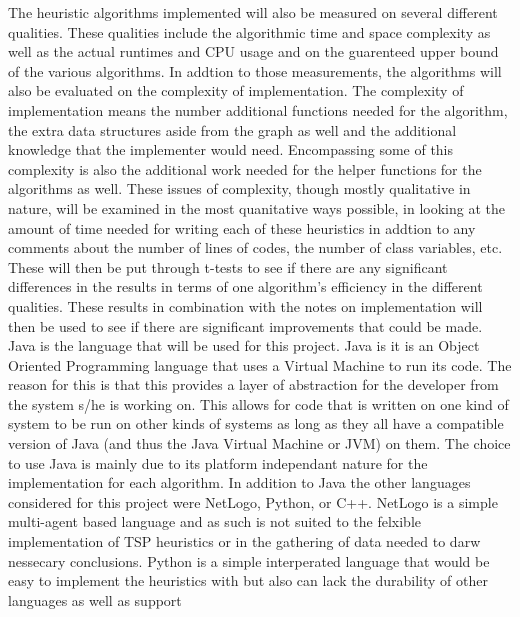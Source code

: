 \documentclass[midd]{thesis}
\newcommand{\tab}{\hspace*{2em}}
\begin{document}
\tab The heuristic algorithms implemented will also be measured on several different qualities. These qualities include the algorithmic time and space complexity as well as the actual runtimes and CPU usage and on the guarenteed upper bound of the various algorithms. In addtion to those measurements, the algorithms will also be evaluated on the complexity of implementation. The complexity of implementation means the number additional functions needed for the algorithm, the extra data structures aside from the graph as well and the additional knowledge that the implementer would need. Encompassing some of this complexity is also the additional work needed for the helper functions for the algorithms as well. These issues of complexity, though mostly qualitative in nature, will be examined in the most quanitative ways possible, in looking at the amount of time needed for writing each of these heuristics in addtion to any comments about the number of lines of codes, the number of class variables, etc. These will then be put through t-tests to see if there are any significant differences in the results in terms of one algorithm's efficiency in the different qualities. These results in combination with the notes on implementation will then be used to see if there are significant improvements that could be made.\\
\tab Java is the language that will be used for this project. Java is it is an Object Oriented Programming language that uses a Virtual Machine to run its code. The reason for this is that this provides a layer of abstraction for the developer from the system s/he is working on. This allows for code that is written on one kind of system to be run on other kinds of systems as long as they all have a compatible version of Java (and thus the Java Virtual Machine or JVM) on them. The choice to use Java is mainly due to its platform independant nature for the implementation for each algorithm. In addition to Java the other languages considered for this project were NetLogo, Python, or C++. NetLogo is a simple multi-agent based language and as such is not suited to the felxible implementation of TSP heuristics or in the gathering of data needed to darw nessecary conclusions. Python is a simple interperated language that would be easy to implement the heuristics with but also can lack the durability of other languages as well as support 
\end{document}
